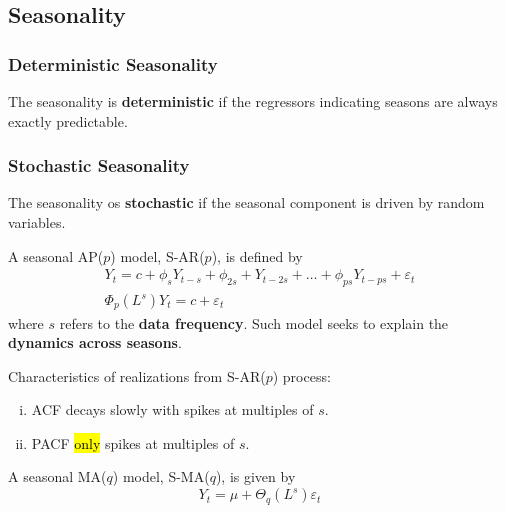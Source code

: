 \documentclass[11pt]{article}
\begin{document}
		\subsection{Seasonality}
			\subsubsection{Deterministic Seasonality}
				\begin{definition}
					The seasonality is \textbf{deterministic} if the regressors indicating seasons are always exactly predictable.
				\end{definition}
			\subsubsection{Stochastic Seasonality}
				\begin{definition}
					The seasonality os \textbf{stochastic} if the seasonal component is driven by random variables.
				\end{definition}
				
				\begin{definition}
					A seasonal AP($p$) model, S-AR($p$), is defined by
					\begin{gather}
						Y_t = c + \phi_s Y_{t-s} + \phi_{2s} + Y_{t-2s} + \dots + \phi_{ps} Y_{t - ps} + \varepsilon_t \\
						\Phi_{p}(L^s) Y_t = c + \varepsilon_t
					\end{gather}
					where $s$ refers to the \textbf{data frequency}. Such model seeks to explain the \textbf{dynamics across seasons}.
				\end{definition}
				
				\begin{definition}
					Characteristics of realizations from S-AR($p$) process:
					\begin{enumerate}[(i)]
						\item ACF decays slowly with spikes at multiples of $s$.
						\item PACF \hl{only} spikes at multiples of $s$.
					\end{enumerate}
				\end{definition}
				
				\begin{definition}
					A seasonal MA($q$) model, S-MA($q$), is given by
					\begin{equation}
						Y_t = \mu + \Theta_q(L^s) \varepsilon_t
					\end{equation}
				\end{definition}
				
\end{document}
